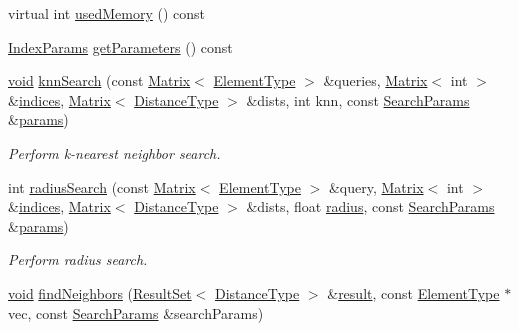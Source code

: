 \begin{DoxyCompactItemize}
\item 
virtual int \hyperlink{classcvflann_1_1Index_a90ac04a2def1bbfd5e7f17e93c0b80ae}{used\-Memory} () const 
\item 
\hyperlink{namespacecvflann_a742b4c7076c21012054af74a9ee48289}{Index\-Params} \hyperlink{classcvflann_1_1Index_a6fa0b0b70ea6c14b674ea49befb2fdf7}{get\-Parameters} () const 
\item 
\hyperlink{legacy_8hpp_a8bb47f092d473522721002c86c13b94e}{void} \hyperlink{classcvflann_1_1Index_ad27d21204e383916770e67bf5c28f4cf}{knn\-Search} (const \hyperlink{classcvflann_1_1Matrix}{Matrix}$<$ \hyperlink{classcvflann_1_1Index_a9fbfc2c13b3226997cfc15fc3a55b7c5}{Element\-Type} $>$ \&queries, \hyperlink{classcvflann_1_1Matrix}{Matrix}$<$ int $>$ \&\hyperlink{legacy_8hpp_a3e3b9b48bcbc7f460efbcfe4399ad24a}{indices}, \hyperlink{classcvflann_1_1Matrix}{Matrix}$<$ \hyperlink{classcvflann_1_1Index_adce66132d9ad41de0181fddd214b5e51}{Distance\-Type} $>$ \&dists, int knn, const \hyperlink{structcvflann_1_1SearchParams}{Search\-Params} \&\hyperlink{compat_8hpp_a0480a03ecc41b20cde376602531d9270}{params})
\begin{DoxyCompactList}\small\item\em Perform k-\/nearest neighbor search. \end{DoxyCompactList}\item 
int \hyperlink{classcvflann_1_1Index_a79685d67c8576e5648fde484bb9fceb0}{radius\-Search} (const \hyperlink{classcvflann_1_1Matrix}{Matrix}$<$ \hyperlink{classcvflann_1_1Index_a9fbfc2c13b3226997cfc15fc3a55b7c5}{Element\-Type} $>$ \&query, \hyperlink{classcvflann_1_1Matrix}{Matrix}$<$ int $>$ \&\hyperlink{legacy_8hpp_a3e3b9b48bcbc7f460efbcfe4399ad24a}{indices}, \hyperlink{classcvflann_1_1Matrix}{Matrix}$<$ \hyperlink{classcvflann_1_1Index_adce66132d9ad41de0181fddd214b5e51}{Distance\-Type} $>$ \&dists, float \hyperlink{imgproc__c_8h_a32526d67e420fc7060ade2efeaeda976}{radius}, const \hyperlink{structcvflann_1_1SearchParams}{Search\-Params} \&\hyperlink{compat_8hpp_a0480a03ecc41b20cde376602531d9270}{params})
\begin{DoxyCompactList}\small\item\em Perform radius search. \end{DoxyCompactList}\item 
\hyperlink{legacy_8hpp_a8bb47f092d473522721002c86c13b94e}{void} \hyperlink{classcvflann_1_1Index_a65866d94e0d29a5b9ffca22aba51e6b2}{find\-Neighbors} (\hyperlink{classcvflann_1_1ResultSet}{Result\-Set}$<$ \hyperlink{classcvflann_1_1Index_adce66132d9ad41de0181fddd214b5e51}{Distance\-Type} $>$ \&\hyperlink{legacy_8hpp_a0bb77d54f6769867cfdf389897bd8e43}{result}, const \hyperlink{classcvflann_1_1Index_a9fbfc2c13b3226997cfc15fc3a55b7c5}{Element\-Type} $\ast$vec, const \hyperlink{structcvflann_1_1SearchParams}{Search\-Params} \&search\-Params)

\end{DoxyCompactItemize}
